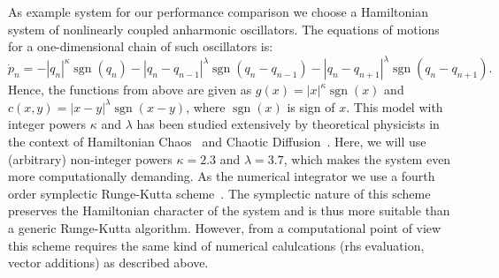 \documentclass[10pt]{elsarticle}
\newcommand{\sgn}{\operatorname{sgn}}
\begin{document}
As example system for our performance comparison we choose a Hamiltonian system of nonlinearly coupled anharmonic oscillators.
The equations of motions for a one-dimensional chain of such oscillators is:
\begin{equation}
 \dot p_n = -|q_n|^\kappa\sgn(q_n) - |q_n-q_{n-1}|^\lambda\sgn(q_n-q_{n-1}) - |q_n-q_{n+1}|^\lambda\sgn(q_n-q_{n+1}).
\end{equation} 
Hence, the functions from above are given as $g(x) = |x|^\kappa\sgn(x)$ and $c(x,y)=|x-y|^\lambda\sgn(x-y)$, where $\sgn(x)$ is sign of $x$.
This model with integer powers $\kappa$ and $\lambda$ has been studied extensively by theoretical physicists in the context of Hamiltonian Chaos~\cite{Mulansky-Ahnert-Pikovsky-Shepelyansky-11} and Chaotic Diffusion~\cite{Mulansky_Pikovksy_12,mulansky2013energy,Mulansky_phd_12}.
Here, we will use (arbitrary) non-integer powers $\kappa=2.3$ and $\lambda=3.7$, which makes the system even more computationally demanding.
As the numerical integrator we use a fourth order symplectic Runge-Kutta scheme~\cite{McLachlan_95}.
The symplectic nature of this scheme preserves the Hamiltonian character of the system and is thus more suitable than a generic Runge-Kutta algorithm.
However, from a computational point of view this scheme requires the same kind of numerical calulcations (rhs evaluation, vector additions) as described above.
\end{document}
